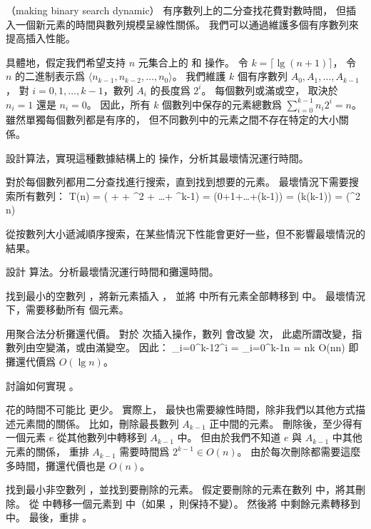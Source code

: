 \startPROBLEM
（making binary search dynamic）
有序數列上的二分查找花費對數時間，
但插入一個新元素的時間與數列規模呈線性關係。
我們可以通過維護多個有序數列來提高插入性能。

具體地，假定我們希望支持 $n$ 元集合上的  和  操作。
令 $k=\lceil \lg{(n+1)}\rceil$，
令 $n$ 的二進制表示爲 $\langle n_{k-1},n_{k-2},\ldots,n_0\rangle$。
我們維護 $k$ 個有序數列 $A_0,A_1,\ldots,A_{k-1}$，
對 $i=0,1,\ldots,{k-1}$，數列 $A_i$ 的長度爲 $2^i$。
每個數列或滿或空，
取決於 $n_i=1$ 還是 $n_i=0$。
因此，所有 $k$ 個數列中保存的元素總數爲 $\sum_{i=0}^{k-1}n_i 2^i = n$。
雖然單獨每個數列都是有序的，
但不同數列中的元素之間不存在特定的大小關係。

\startigBase[a]\startitem
設計算法，實現這種數據結構上的  操作，分析其最壞情況運行時間。
\stopitem\stopigBase

\startANSWER
對於每個數列都用二分查找進行搜索，直到找到想要的元素。
最壞情況下需要搜索所有數列：
\startformula\startmathalignment
\NC T(n) \NC = \Theta( +  + ^2 + \ldots + ^{k-1}) \NR
\NC \NC = \Theta(0+1+\ldots+(k-1)) \NR
\NC \NC = \Theta(k(k-1)) \NR
\NC \NC = \Theta(\lg^2 n) \NR
\stopmathalignment\stopformula

從按數列大小遞減順序搜索，在某些情況下性能會更好一些，但不影響最壞情況的結果。
\stopANSWER

\startigBase[a,continue]\startitem
設計  算法。分析最壞情況運行時間和攤還時間。
\stopitem\stopigBase

\startANSWER
找到最小的空數列 ，將新元素插入 ，
並將  中所有元素全部轉移到  中。
最壞情況下，需要移動所有  個元素。

用聚合法分析攤還代價。
對於  次插入操作，數列  會改變  次，
此處所謂改變，指數列由空變滿，或由滿變空。
因此：
\startformula
\sum_{i=0}^{k-1}2^i = \sum_{i=0}^{k-1}n = nk \in O(n\lg n)
\stopformula
即攤還代價爲 $O(\lg n)$。
\stopANSWER

\startigBase[a,continue]\startitem
討論如何實現 。
\stopitem\stopigBase

\startANSWER
{} 花的時間不可能比  更少。
實際上，  最快也需要線性時間，除非我們以其他方式描述元素間的關係。
比如，刪除最長數列 $A_{k-1}$ 正中間的元素。
刪除後，至少得有一個元素 $e$ 從其他數列中轉移到 $A_{k-1}$ 中。
但由於我們不知道 $e$ 與 $A_{k-1}$ 中其他元素的關係，
重排 $A_{k-1}$ 需要時間爲 $2^{k-1}\in O(n)$。
由於每次刪除都需要這麼多時間，攤還代價也是 $O(n)$。

找到最小非空數列 ，並找到要刪除的元素。
假定要刪除的元素在數列  中，將其刪除。
從  中轉移一個元素到  中（如果 ，則保持不變）。
然後將  中剩餘元素轉移到  中。
最後，重排 。
\stopANSWER

\stopPROBLEM
